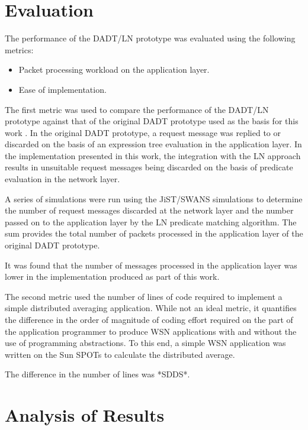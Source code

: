 \section{Evaluation}

The performance of the DADT/LN prototype was evaluated using the following
metrics: 
\begin{itemize}
  \item Packet processing workload on the application layer.
  \item Ease of implementation. 
\end{itemize}

The first metric was used to compare the performance of the DADT/LN prototype
against that of the original DADT prototype used as the basis for this work
\cite{migliavacca_DADT:2006}. In the original DADT prototype, a request message
was replied to or discarded on the basis of an expression tree evaluation in the
application layer. In the implementation presented in this work, the integration
with the LN approach results in unsuitable request messages being discarded on
the basis of predicate evaluation in the network layer. 


A series of simulations were run using the JiST/SWANS simulations to determine
the number of request messages discarded at the network layer and the number
passed on to the application layer by the LN predicate matching algorithm. The
sum provides the total number of packets processed in the application layer of
the original DADT prototype.

It was found that the number of messages processed in the application layer was
lower in the implementation produced as part of this work.


The second metric used the number of lines of code required to implement a
simple distributed averaging application. While not an ideal metric, it
quantifies the difference in the order of magnitude of coding effort required on
the part of the application programmer to produce WSN applications with and
without the use of programming abstractions. To this end, a simple WSN
application was written on the Sun SPOTs to calculate the distributed average.

The difference in the number of lines was *SDDS*.

\section{Analysis of Results}

